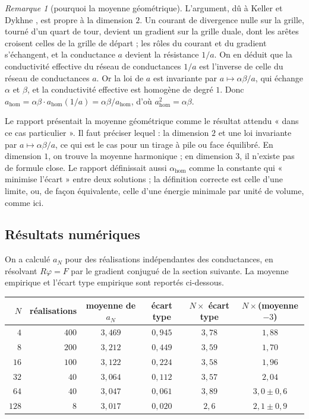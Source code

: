 \documentclass[11pt,a4paper]{article}
\theoremstyle{plain}
\theoremstyle{definition}
\theoremstyle{remark}
\newtheorem{remarque}[theoreme]{Remarque}
\begin{document}
\begin{remarque}[pourquoi la moyenne géométrique]
L'argument, dû à Keller \cite{keller} et Dykhne \cite{dykhne}, est propre à la dimension $2$. Un courant de divergence nulle sur la grille, tourné d'un quart de tour, devient un gradient sur la grille duale, dont les arêtes croisent celles de la grille de départ ; les rôles du courant et du gradient s'échangent, et la conductance $a$ devient la résistance $1/a$. On en déduit que la conductivité effective du réseau de conductances $1/a$ est l'inverse de celle du réseau de conductances $a$. Or la loi de $a$ est invariante par $a\mapsto\alpha\beta/a$, qui échange $\alpha$ et $\beta$, et la conductivité effective est homogène de degré $1$. Donc $a_{\mathrm{hom}}=\alpha\beta\cdot a_{\mathrm{hom}}(1/a)=\alpha\beta/a_{\mathrm{hom}}$, d'où $a_{\mathrm{hom}}^2=\alpha\beta$.

Le rapport présentait la moyenne géométrique comme le résultat attendu « dans ce cas particulier ». Il faut préciser lequel : la dimension $2$ et une loi invariante par $a\mapsto\alpha\beta/a$, ce qui est le cas pour un tirage à pile ou face équilibré. En dimension $1$, on trouve la moyenne harmonique ; en dimension $3$, il n'existe pas de formule close. Le rapport définissait aussi $\alpha_{\mathrm{hom}}$ comme la constante qui « minimise l'écart » entre deux solutions ; la définition correcte est celle d'une limite, ou, de façon équivalente, celle d'une énergie minimale par unité de volume, comme ici.
\end{remarque}

\subsection{Résultats numériques}

On a calculé $a_N$ pour des réalisations indépendantes des conductances, en résolvant $R\varphi=F$ par le gradient conjugué de la section suivante. La moyenne empirique et l'écart type empirique sont reportés ci-dessous.

\begin{center}
\begin{tabular}{@{}rrcccc@{}}
\toprule
$N$ & réalisations & moyenne de $a_N$ & écart type & $N\times$ écart type & $N\times$(moyenne $-3$) \\
\midrule
$4$ & $400$ & $3{,}469$ & $0{,}945$ & $3{,}78$ & $1{,}88$ \\
$8$ & $200$ & $3{,}212$ & $0{,}449$ & $3{,}59$ & $1{,}70$ \\
$16$ & $100$ & $3{,}122$ & $0{,}224$ & $3{,}58$ & $1{,}96$ \\
$32$ & $40$ & $3{,}064$ & $0{,}112$ & $3{,}57$ & $2{,}04$ \\
$64$ & $40$ & $3{,}047$ & $0{,}061$ & $3{,}89$ & $3{,}0\pm0{,}6$ \\
$128$ & $8$ & $3{,}017$ & $0{,}020$ & $2{,}6$ & $2{,}1\pm0{,}9$ \\
\bottomrule
\end{tabular}
\end{center}
\end{document}
